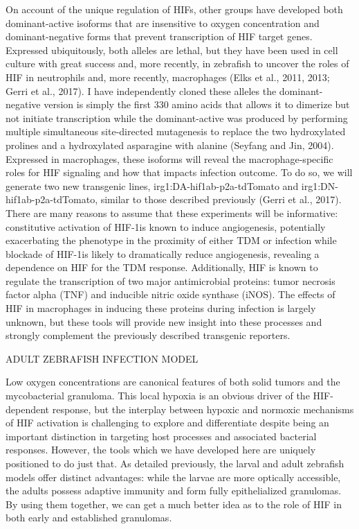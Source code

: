 On account of the unique regulation of HIFs, other groups have developed both dominant-active isoforms that are insensitive to oxygen concentration and dominant-negative forms that prevent transcription of HIF target genes. Expressed ubiquitously, both alleles are lethal, but they have been used in cell culture with great success and, more recently, in zebrafish to uncover the roles of HIF in neutrophils and, more recently, macrophages (Elks et al., 2011, 2013; Gerri et al., 2017). I have independently cloned these alleles  the dominant-negative version is simply the first 330 amino acids that allows it to dimerize but not initiate transcription while the dominant-active was produced by performing multiple simultaneous site-directed mutagenesis to replace the two hydroxylated prolines and a hydroxylated asparagine with alanine (Seyfang and Jin, 2004).
Expressed in macrophages, these isoforms will reveal the macrophage-specific roles for HIF signaling and how that impacts infection outcome. To do so, we will generate two new transgenic lines, irg1:DA-hif1ab-p2a-tdTomato and irg1:DN-hif1ab-p2a-tdTomato, similar to those described previously (Gerri et al., 2017). There are many reasons to assume that these experiments will be informative: constitutive activation of HIF-1\textalpha is known to induce angiogenesis, potentially exacerbating the phenotype in the proximity of either TDM or infection while blockade of HIF-1\textalpha is likely to dramatically reduce angiogenesis, revealing a dependence on HIF for the TDM response. Additionally, HIF is known to regulate the transcription of two major antimicrobial proteins: tumor necrosis factor alpha (TNF) and inducible nitric oxide synthase (iNOS). The effects of HIF in macrophages in inducing these proteins during infection is largely unknown, but these tools will provide new insight into these processes and strongly complement the previously described transgenic reporters.  

ADULT ZEBRAFISH INFECTION MODEL

Low oxygen concentrations are canonical features of both solid tumors and the mycobacterial granuloma. This local hypoxia is an obvious driver of the HIF-dependent response, but the interplay between hypoxic and normoxic mechanisms of HIF activation is challenging to explore and differentiate despite being an important distinction in targeting host processes and associated bacterial responses. However, the tools which we have developed here are uniquely positioned to do just that. As detailed previously, the larval and adult zebrafish models offer distinct advantages: while the larvae are more optically accessible, the adults possess adaptive immunity and form fully epithelialized granulomas. By using them together, we can get a much better idea as to the role of HIF in both early and established granulomas. 

